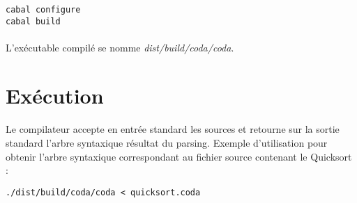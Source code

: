 \documentclass[a4paper]{article}
\begin{document}
\begin{lstlisting}
cabal configure
cabal build
\end{lstlisting}

    \paragraph{}L'exécutable compilé se nomme \textit{dist/build/coda/coda}.

  \section{Exécution}

    \paragraph{}Le compilateur accepte en entrée standard les sources et
retourne sur la sortie standard l'arbre syntaxique résultat du parsing. Exemple
d'utilisation pour obtenir l'arbre syntaxique correspondant au fichier source
contenant le Quicksort :

\begin{lstlisting}
./dist/build/coda/coda < quicksort.coda
\end{lstlisting}
\end{document}
